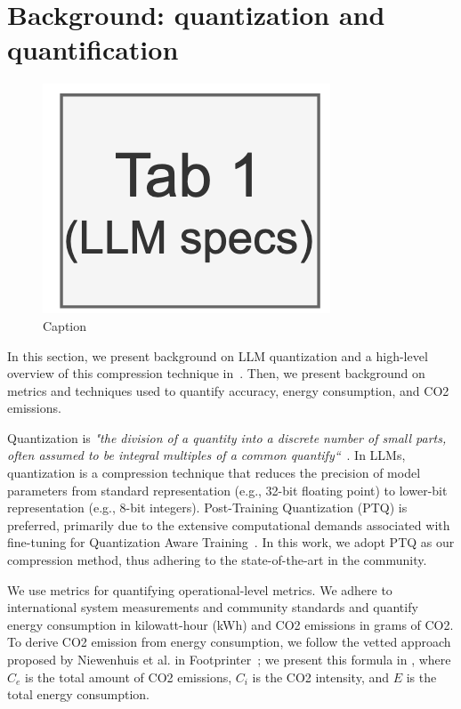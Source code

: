 \section{Background: quantization and quantification} \label{sec:background}

\begin{figure}
    \centering
    \includegraphics[width=0.75\linewidth]{reportTemplate/figures/f2.png}
    \caption{Caption}
    \label{fig:background}
\end{figure}

In this section, we present background on LLM quantization and a high-level overview of this compression technique in~. Then, we present background on metrics and techniques used to quantify accuracy, energy consumption, and CO2 emissions. 

Quantization is \textit{"the division of a quantity into a discrete number of small parts, often assumed to be integral multiples of a common quantify``}~\cite{DBLP:journals/corr/abs-2411-02530}. In LLMs, quantization is a compression technique that reduces the precision of model parameters from standard representation (e.g., 32-bit floating point) to lower-bit representation (e.g., 8-bit integers). Post-Training Quantization (PTQ) is preferred, primarily due to
the extensive computational demands associated with fine-tuning for Quantization Aware Training~\cite{zhang2023dual, DBLP:conf/icml/NagelABLB20, DBLP:journals/corr/abs-2006-10518}. In this work, we adopt PTQ as our compression method, thus adhering to the state-of-the-art in the community.

We use metrics for quantifying operational-level metrics. We adhere to international system measurements and community standards and quantify energy consumption in kilowatt-hour (kWh) and CO2 emissions in grams of CO2. To derive CO2 emission from energy consumption, we follow the vetted approach proposed by Niewenhuis et al. in Footprinter~\cite{DBLP:conf/wosp/NiewenhuisTIM24}; we present this formula in , where $C_e$ is the total amount of CO2 emissions, $C_i$ is the CO2 intensity, and $E$ is the total energy consumption.

